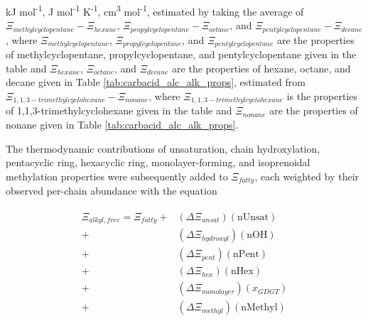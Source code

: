 {\begin{table}
\begin{threeparttable}
\begin{tablenotes}
     kJ mol\textsuperscript{-1},
     J mol\textsuperscript{-1} K\textsuperscript{-1},
     cm\textsuperscript{3} mol\textsuperscript{-1},
     estimated by taking the average of $\Xi_{methylcyclopentane} - \Xi_{hexane}$, $\Xi_{propylcyclopentane} - \Xi_{octane}$, and $\Xi_{pentylcyclopentane} - \Xi_{decane}$, where $\Xi_{methylcyclopentane}$, $\Xi_{propylcyclopentane}$, and $\Xi_{pentylcyclopentane}$ are the properties of methylcyclopentane, propylcyclopentane, and pentylcyclopentane given in the table and $\Xi_{hexane}$, $\Xi_{octane}$, and $\Xi_{decane}$ are the properties of hexane, octane, and decane given in Table \ref{tab:carbacid_alc_alk_props},
     estimated from $\Xi_{1,1,3-trimethylcyclohexane} - \Xi_{nonane}$, where $\Xi_{1,1,3-trimethylcyclohexane}$ is the properties of 1,1,3-trimethylcyclohexane given in the table and $\Xi_{nonane}$ are the properties of nonane given in Table \ref{tab:carbacid_alc_alk_props}.
    
        
  \end{tablenotes}
  
  \label{tab:ring}
  \end{threeparttable}
\end{table}
\setcounter{tabcounter}{0} %
\doublespace
\clearpage
}

The thermodynamic contributions of unsaturation, chain hydroxylation, pentacyclic ring, hexacyclic ring, monolayer-forming, and isoprenoidal methylation properties were subsequently added to $\Xi_{fatty}$, each weighted by their observed per-chain abundance with the equation

\begin{align}
\begin{split}
\Xi_{alkyl, free} = \Xi_{fatty}
            + & (\Delta\Xi_{unsat})(\text{nUnsat}) \\
            + & (\Delta\Xi_{hydroxyl})(\text{nOH}) \\
            + & (\Delta\Xi_{pent})(\text{nPent}) \\
            + & (\Delta\Xi_{hex})(\text{nHex}) \\
            + & (\Delta\Xi_{monolayer})(x_{GDGT}) \\
            + & (\Delta\Xi_{methyl})(\text{nMethyl}) \\
\end{split}
\end{align}

